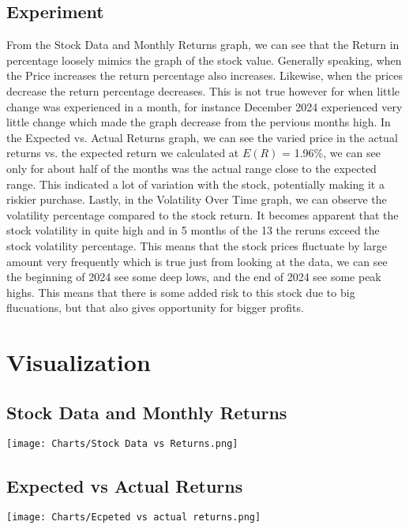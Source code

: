 \documentclass[12]{amsart}
\begin{document}
\begin{flushleft}
\begin{flushleft}
\subsection{Experiment}
From the Stock Data and Monthly Returns graph, we can see that the Return in percentage loosely mimics the graph of the stock value. Generally speaking, when the Price increases the return percentage also increases. Likewise, when the prices decrease the return percentage decreases. This is not true however for when little change was experienced in a month, for instance December 2024 experienced very little change which made the graph decrease from the pervious months high. 
\newline
\newline
In the Expected vs. Actual Returns graph, we can see the varied price in the actual returns vs. the expected return we calculated at $E(R)$ = 1.96\%, we can see only for about half of the months was the actual range close to the expected range. This indicated a lot of variation with the stock, potentially making it a riskier purchase.
\newline 
\newline
Lastly, in the Volatility Over Time graph, we can observe the volatility percentage compared to the stock return. It becomes apparent that the stock volatility in quite high and in 5 months of the 13 the reruns exceed the stock volatility percentage. This means that the stock prices fluctuate by large amount very frequently which is true just from looking at the data, we can see the beginning of 2024 see some deep lows, and the end of 2024 see some peak highs. This means that there is some added risk to this stock due to big flucuations, but that also gives opportunity for bigger profits.

\section*{Visualization}
\subsection*{Stock Data and Monthly Returns}
\texttt{[image: Charts/Stock Data vs Returns.png]}

\subsection*{Expected vs Actual Returns}
\texttt{[image: Charts/Ecpeted vs actual returns.png]}


\end{flushleft}
\end{flushleft}
\end{document}
